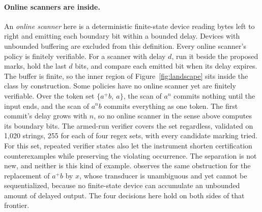 \documentclass[11pt,a4paper]{article}
\theoremstyle{definition}
\theoremstyle{plain}
\begin{document}
\paragraph{Online scanners are inside.} An \emph{online scanner} here is a deterministic finite-state device reading
bytes left to right and emitting each boundary bit within a bounded delay. Devices with unbounded buffering are excluded
from this definition. Every online scanner's policy is finitely verifiable. For a scanner with delay $d$, run it beside
the proposed marks, hold the last $d$ bits, and compare each emitted bit when its delay expires. The buffer is finite,
so the inner region of Figure~\ref{fig:landscape} sits inside the class by construction. Some policies have no online
scanner yet are finitely verifiable. Over the token set $\{a^{+}b,\ a\}$, the scan of $a^n$ commits nothing until the
input ends, and the scan of $a^n b$ commits everything as one token. The first commit's delay grows with $n$, so no
online scanner in the sense above computes its boundary bits. The armed-run verifier covers the set regardless,
validated on 1{,}020 strings, 255 for each of four regex sets, with every candidate marking tried. For this set,
repeated verifier states also let the instrument shorten certification counterexamples while preserving the violating
occurrence. The separation is not new, and neither is this kind of example. \citet{karttunen1996directed} observes the
same obstruction for the replacement of $a^{+}b$ by $x$, whose transducer is unambiguous and yet cannot be
sequentialized, because no finite-state device can accumulate an unbounded amount of delayed output. The four decisions
here hold on both sides of that frontier.
\end{document}
